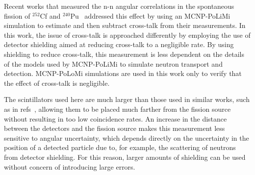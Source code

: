 Recent works that measured the n-n angular correlations in the spontaneous fission of $^{252}$Cf and $^{240}$Pu~\cite{Pozzi2016,Verbeke2018} addressed this effect by using an MCNP-PoLiMi simulation to estimate and then subtract cross-talk from their measurements.
In this work, the issue of cross-talk is approached differently by employing the use of detector shielding aimed at reducing cross-talk to a negligible rate.
By using shielding to reduce cross-talk, this measurement is less dependent on the details of the models used by MCNP-PoLiMi to simulate neutron transport and detection.
MCNP-PoLoMi simulations are used in this work only to verify that the effect of cross-talk is negligible.

The scintillators used here are much larger than those used in similar works, such as in refs~\cite{Pozzi2016,Verbeke2018}, allowing them to be placed much farther from the fission source without resulting in too low coincidence rates. 
An increase in the distance between the detectors and the fission source makes this measurement less sensitive to angular uncertainty, which depends directly on the uncertainty in the position of a detected particle due to, for example, the scattering of neutrons from detector shielding.
For this reason, larger amounts of shielding can be used without concern of introducing large errors.

